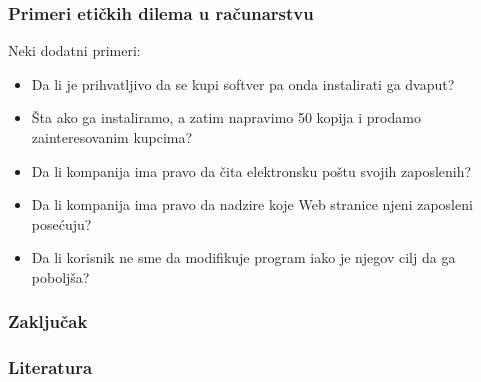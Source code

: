 \documentclass[pdf]{beamer}
\begin{document}
\begin{frame}
\frametitle{Primeri etičkih dilema u računarstvu}
	Neki dodatni primeri:
	\begin{itemize}
	\item Da li je prihvatljivo da se kupi softver pa onda instalirati ga dvaput?
	\item Šta ako ga instaliramo, a zatim napravimo 50 kopija i prodamo zainteresovanim kupcima?
	\item Da li kompanija ima pravo da čita elektronsku poštu svojih zaposlenih?
	\item Da li kompanija ima pravo da nadzire koje Web stranice njeni zaposleni posećuju?
	\item Da li korisnik ne sme da modifikuje program iako je njegov cilj da ga poboljša?
	\end{itemize}
\end{frame}

\begin{frame}
\frametitle{Zaključak}
	\end{frame}


\begin{frame}
\frametitle{Literatura}
	\end{frame}
\end{document}
